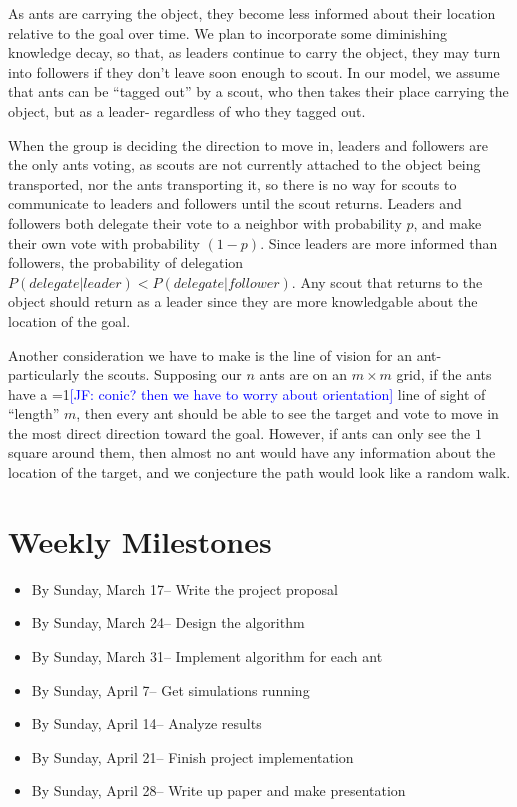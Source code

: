 \documentclass[12pt]{article}
\newcommand{\Comments}{1}
\newcommand{\mynote}[2]{\ifnum\Comments=1\textcolor{#1}{#2}\fi}
\newcommand{\jessie}[1]{\mynote{blue}{[JF: #1]}}
\begin{document}
As ants are carrying the object, they become less informed about their location relative to the goal over time.
We plan to incorporate some diminishing knowledge decay, so that, as leaders continue to carry the object, they may turn into followers if they don't leave soon enough to scout.
In our model, we assume that ants can be ``tagged out'' by a scout, who then takes their place carrying the object, but as a leader- regardless of who they tagged out.

When the group is deciding the direction to move in, leaders and followers are the only ants voting, as scouts are not currently attached to the object being transported, nor the ants transporting it, so there is no way for scouts to communicate to leaders and followers until the scout returns.
Leaders and followers both delegate their vote to a neighbor with probability $p$, and make their own vote with probability $(1-p)$.
Since leaders are more informed than followers, the probability of delegation $P(delegate|leader) < P(delegate|follower)$.
Any scout that returns to the object should return as a leader since they are more knowledgable about the location of the goal.

Another consideration we have to make is the line of vision for an ant- particularly the scouts.
Supposing our $n$ ants are on an $m \times m$ grid, if the ants have a \jessie{conic? then we have to worry about orientation} line of sight of ``length'' $m$, then every ant should be able to see the target and vote to move in the most direct direction toward the goal.
However, if ants can only see the $1$ square around them, then almost no ant would have any information about the location of the target, and we conjecture the path would look like a random walk.


\section{Weekly Milestones}
\begin{itemize}
\item By Sunday, March 17-- Write the project proposal
\item By Sunday, March 24-- Design the algorithm
\item By Sunday, March 31-- Implement algorithm for each ant
\item By Sunday, April 7-- Get simulations running
\item By Sunday, April 14-- Analyze results
\item By Sunday, April 21-- Finish project implementation
\item By Sunday, April 28-- Write up paper and make presentation
\end{itemize}
\end{document}
